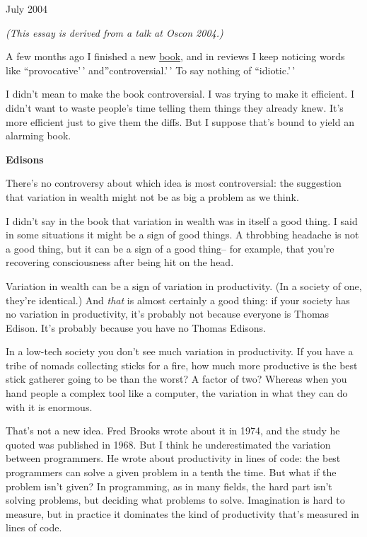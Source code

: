 July 2004

\emph{(This essay is derived from a talk at Oscon 2004.)}

A few months ago I finished a new
\href{http://www.amazon.com/exec/obidos/tg/detail/-/0596006624}{book},
and in reviews I keep noticing words like ``provocative'\,'
and''controversial.'\,' To say nothing of ``idiotic.'\,'

I didn't mean to make the book controversial. I was trying to make it
efficient. I didn't want to waste people's time telling them things they
already knew. It's more efficient just to give them the diffs. But I
suppose that's bound to yield an alarming book.

\textbf{Edisons}

There's no controversy about which idea is most controversial: the
suggestion that variation in wealth might not be as big a problem as we
think.

I didn't say in the book that variation in wealth was in itself a good
thing. I said in some situations it might be a sign of good things. A
throbbing headache is not a good thing, but it can be a sign of a good
thing-- for example, that you're recovering consciousness after being
hit on the head.

Variation in wealth can be a sign of variation in productivity. (In a
society of one, they're identical.) And \emph{that} is almost certainly
a good thing: if your society has no variation in productivity, it's
probably not because everyone is Thomas Edison. It's probably because
you have no Thomas Edisons.

In a low-tech society you don't see much variation in productivity. If
you have a tribe of nomads collecting sticks for a fire, how much more
productive is the best stick gatherer going to be than the worst? A
factor of two? Whereas when you hand people a complex tool like a
computer, the variation in what they can do with it is enormous.

That's not a new idea. Fred Brooks wrote about it in 1974, and the study
he quoted was published in 1968. But I think he underestimated the
variation between programmers. He wrote about productivity in lines of
code: the best programmers can solve a given problem in a tenth the
time. But what if the problem isn't given? In programming, as in many
fields, the hard part isn't solving problems, but deciding what problems
to solve. Imagination is hard to measure, but in practice it dominates
the kind of productivity that's measured in lines of code.

